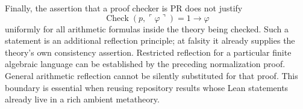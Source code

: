 Finally, the assertion that a proof checker is PR does not justify
\[
 \operatorname{Check}(p,\ulcorner\varphi\urcorner)=1\longrightarrow\varphi
\]
uniformly for all arithmetic formulas inside the theory being checked.
Such a statement is an additional reflection principle; at falsity it
already supplies the theory's own consistency assertion.  Restricted
reflection for a particular finite algebraic language can be established by
the preceding normalization proof.  General arithmetic reflection cannot
be silently substituted for that proof.  This boundary is essential when
reusing repository results whose Lean statements already live in a rich
ambient metatheory.
